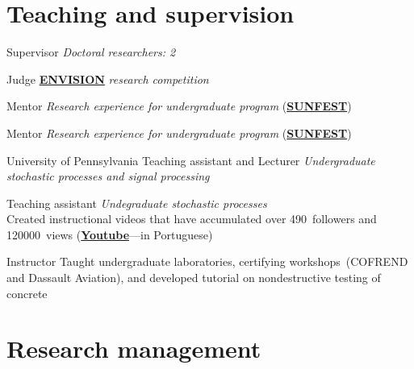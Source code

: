 \documentclass{cvlfoc}
\begin{document}
\section*{Teaching and supervision}

\begin{entrydate}
		{Supervisor}
		{\emph{Doctoral researchers: 2}}

		{Judge}
		{\href{http://envisionrc.com/}{\textbf{ENVISION}} \emph{research competition}}

		{Mentor}
		{\emph{Research experience for undergraduate program} (\href{https://sunfest.seas.upenn.edu}{\textbf{SUNFEST}})}

		{Mentor}
		{\emph{Research experience for undergraduate program} (\href{https://sunfest.seas.upenn.edu}{\textbf{SUNFEST}})}

		{University of Pennsylvania}
		{Teaching assistant and Lecturer}
		{\emph{Undergraduate stochastic processes and signal processing}}

		{Teaching assistant}
		{\emph{Undegraduate stochastic processes}\\
		Created instructional videos that have accumulated over 490~followers and\\ 120000~views
		(\href{https://www.youtube.com/@videos-aleatorios}{\textbf{Youtube}}---in Portuguese)}

		{Instructor}
		{Taught undergraduate laboratories, certifying workshops~(COFREND and Dassault Aviation), and developed tutorial on nondestructive testing of concrete}
\end{entrydate}



\section*{Research management}
\end{document}
